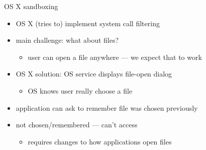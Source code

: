 
\begin{frame}{OS X sandboxing}
    \begin{itemize}
    \item OS X (tries to) implement system call filtering
    \item main challenge: what about files?
        \begin{itemize}
        \item user can open a file anywhere --- we expect that to work
        \end{itemize}
    \item<2> OS X solution: OS service displays file-open dialog
        \begin{itemize}
        \item OS knows user really choose a file
        \end{itemize}
    \item<2> application can ask to remember file was chosen previously
    \item<2> not chosen/remembered --- can't access
        \begin{itemize}
        \item requires changes to how applications open files
        \end{itemize}
    \end{itemize}
\end{frame}

